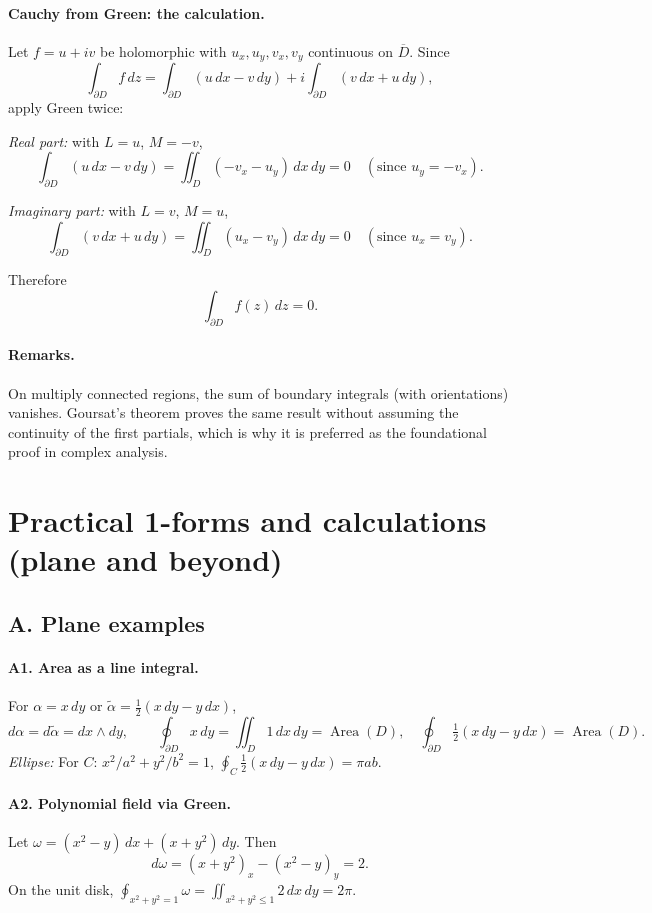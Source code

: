 \documentclass[11pt]{article}
\begin{document}
\paragraph{Cauchy from Green: the calculation.}
Let $f=u+iv$ be holomorphic with $u_x,u_y,v_x,v_y$ continuous on $\overline D$. Since
\[
\int_{\partial D} f\,dz
=\int_{\partial D} (u\,dx-v\,dy)
+i\int_{\partial D} (v\,dx+u\,dy),
\]
apply Green twice:

\emph{Real part:} with $L=u$, $M=-v$,
\[
\int_{\partial D} (u\,dx-v\,dy)
=\iint_D (-v_x-u_y)\,dx\,dy=0
\quad(\text{since }u_y=-v_x).
\]

\emph{Imaginary part:} with $L=v$, $M=u$,
\[
\int_{\partial D} (v\,dx+u\,dy)
=\iint_D (u_x-v_y)\,dx\,dy=0
\quad(\text{since }u_x=v_y).
\]

Therefore
\[
\boxed{\ \displaystyle \int_{\partial D} f(z)\,dz=0.\ }
\]

\paragraph{Remarks.}
On multiply connected regions, the sum of boundary integrals (with orientations) vanishes.
Goursat’s theorem proves the same result without assuming the continuity of the first partials,
which is why it is preferred as the foundational proof in complex analysis.

\section*{Practical 1-forms and calculations (plane and beyond)}

\subsection*{A. Plane examples}

\paragraph{A1. Area as a line integral.}
For $\alpha = x\,dy$ or $\tilde\alpha=\tfrac12(x\,dy-y\,dx)$,
\[
d\alpha=d\tilde\alpha=dx\wedge dy,\qquad
\oint_{\partial D} x\,dy = \iint_D 1\,dx\,dy = \operatorname{Area}(D),
\quad
\oint_{\partial D} \tfrac12(x\,dy-y\,dx) = \operatorname{Area}(D).
\]
\emph{Ellipse:} For $C:\, x^2/a^2+y^2/b^2=1$, $\displaystyle \oint_C \tfrac12(x\,dy-y\,dx)=\pi ab$.

\paragraph{A2. Polynomial field via Green.}
Let $\omega=(x^2-y)\,dx+(x+y^2)\,dy$. Then
\[
d\omega=(x+y^2)_x-(x^2-y)_y=2.
\]
On the unit disk, $\displaystyle \oint_{x^2+y^2=1} \omega = \iint_{x^2+y^2\le1} 2\,dx\,dy=2\pi$.
\end{document}
